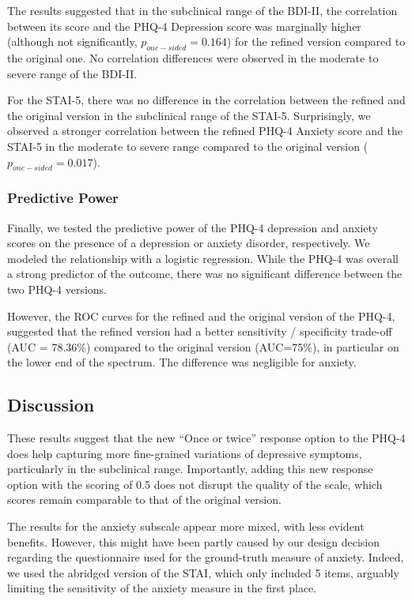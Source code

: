 \documentclass[
  jou,
  floatsintext,
  longtable,
  nolmodern,
  notxfonts,
  notimes,
  colorlinks=true,linkcolor=blue,citecolor=blue,urlcolor=blue]{apa7}
\begin{document}
The results suggested that in the subclinical range of the BDI-II, the
correlation between its score and the PHQ-4 Depression score was
marginally higher (although not significantly,
\(p_{one-sided} = 0.164\)) for the refined version compared to the
original one. No correlation differences were observed in the moderate
to severe range of the BDI-II.

For the STAI-5, there was no difference in the correlation between the
refined and the original version in the subclinical range of the STAI-5.
Surprisingly, we observed a stronger correlation between the refined
PHQ-4 Anxiety score and the STAI-5 in the moderate to severe range
compared to the original version (\(p_{one-sided} = 0.017\)).

\subsubsection{Predictive Power}\label{predictive-power}

Finally, we tested the predictive power of the PHQ-4 depression and
anxiety scores on the presence of a depression or anxiety disorder,
respectively. We modeled the relationship with a logistic regression.
While the PHQ-4 was overall a strong predictor of the outcome, there was
no significant difference between the two PHQ-4 versions.

However, the ROC curves for the refined and the original version of the
PHQ-4, suggested that the refined version had a better sensitivity /
specificity trade-off (AUC = 78.36\%) compared to the original version
(AUC=75\%), in particular on the lower end of the spectrum. The
difference was negligible for anxiety.

\subsection{Discussion}\label{discussion-1}

These results suggest that the new ``Once or twice'' response option to
the PHQ-4 does help capturing more fine-grained variations of depressive
symptoms, particularly in the subclinical range. Importantly, adding
this new response option with the scoring of 0.5 does not disrupt the
quality of the scale, which scores remain comparable to that of the
original version.

The results for the anxiety subscale appear more mixed, with less
evident benefits. However, this might have been partly caused by our
design decision regarding the questionnaire used for the ground-truth
measure of anxiety. Indeed, we used the abridged version of the STAI,
which only included 5 items, arguably limiting the sensitivity of the
anxiety measure in the first place.
\end{document}
